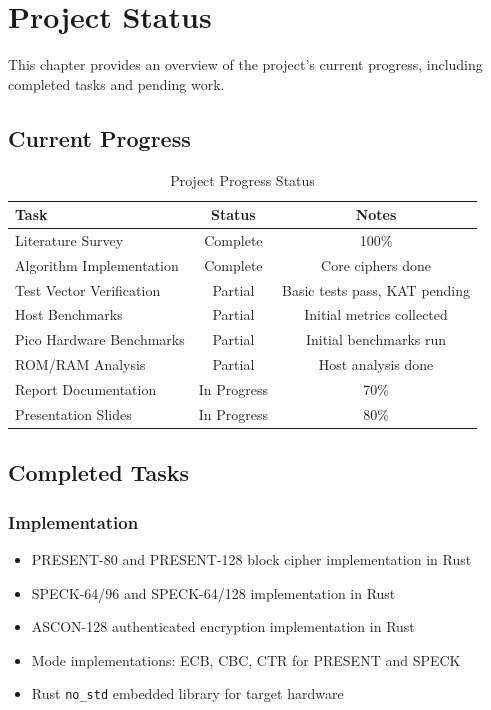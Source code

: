 \documentclass[12pt]{report}
\begin{document}
\chapter{Project Status}

This chapter provides an overview of the project's current progress, including completed tasks and pending work.

\section{Current Progress}

\begin{table}[H]
    \centering
    \begin{tabular}{lcc}
        \hline
        \textbf{Task} & \textbf{Status} & \textbf{Notes} \\
        \hline
        Literature Survey & Complete & 100\% \\
        Algorithm Implementation & Complete & Core ciphers done \\
        Test Vector Verification & Partial & Basic tests pass, KAT pending \\
        Host Benchmarks & Partial & Initial metrics collected \\
        Pico Hardware Benchmarks & Partial & Initial benchmarks run \\
        ROM/RAM Analysis & Partial & Host analysis done \\
        Report Documentation & In Progress & 70\% \\
        Presentation Slides & In Progress & 80\% \\
        \hline
    \end{tabular}
    \caption{Project Progress Status}
    \label{tab:progress}
\end{table}

\section{Completed Tasks}

\subsection{Implementation}
\begin{itemize}
    \item PRESENT-80 and PRESENT-128 block cipher implementation in Rust
    \item SPECK-64/96 and SPECK-64/128 implementation in Rust
    \item ASCON-128 authenticated encryption implementation in Rust
    \item Mode implementations: ECB, CBC, CTR for PRESENT and SPECK
    \item Rust \texttt{no\_std} embedded library for target hardware
\end{itemize}
\end{document}
